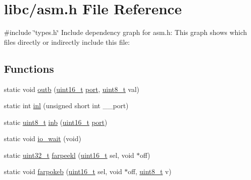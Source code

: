 \hypertarget{a00014}{}\section{libc/asm.h File Reference}
\label{a00014}
{\ttfamily \#include \char`\"{}types.\+h\char`\"{}}\newline
Include dependency graph for asm.\+h\+:
This graph shows which files directly or indirectly include this file\+:
\subsection*{Functions}
\begin{DoxyCompactItemize}
\item 
static void \hyperlink{a00014_aa37f5841c54156a4b14fc0d6f626b44f_aa37f5841c54156a4b14fc0d6f626b44f}{outb} (\hyperlink{a00038_adf4d876453337156dde61095e1f20223_adf4d876453337156dde61095e1f20223}{uint16\+\_\+t} \hyperlink{a00035_a938bdc6ae46c346147b6d4f67ad1e704_a938bdc6ae46c346147b6d4f67ad1e704}{port}, \hyperlink{a00038_aba7bc1797add20fe3efdf37ced1182c5_aba7bc1797add20fe3efdf37ced1182c5}{uint8\+\_\+t} val)
\item 
static int \hyperlink{a00014_a4a68dda29ab57d4961c91746b06af63f_a4a68dda29ab57d4961c91746b06af63f}{inl} (unsigned short int \+\_\+\+\_\+port)
\item 
static \hyperlink{a00038_aba7bc1797add20fe3efdf37ced1182c5_aba7bc1797add20fe3efdf37ced1182c5}{uint8\+\_\+t} \hyperlink{a00014_a0223c8898dfec29069879dc51076e28a_a0223c8898dfec29069879dc51076e28a}{inb} (\hyperlink{a00038_adf4d876453337156dde61095e1f20223_adf4d876453337156dde61095e1f20223}{uint16\+\_\+t} \hyperlink{a00035_a938bdc6ae46c346147b6d4f67ad1e704_a938bdc6ae46c346147b6d4f67ad1e704}{port})
\item 
static void \hyperlink{a00014_a488d1b3600792ee3aac5be4b7e0be16b_a488d1b3600792ee3aac5be4b7e0be16b}{io\+\_\+wait} (void)
\item 
static \hyperlink{a00038_a435d1572bf3f880d55459d9805097f62_a435d1572bf3f880d55459d9805097f62}{uint32\+\_\+t} \hyperlink{a00014_aee0779a0581136320f91a72c4d6b5b90_aee0779a0581136320f91a72c4d6b5b90}{farpeekl} (\hyperlink{a00038_adf4d876453337156dde61095e1f20223_adf4d876453337156dde61095e1f20223}{uint16\+\_\+t} sel, void $\ast$off)
\item 
static void \hyperlink{a00014_a4e7b04b927c6dca2d20f54a5c14a01d6_a4e7b04b927c6dca2d20f54a5c14a01d6}{farpokeb} (\hyperlink{a00038_adf4d876453337156dde61095e1f20223_adf4d876453337156dde61095e1f20223}{uint16\+\_\+t} sel, void $\ast$off, \hyperlink{a00038_aba7bc1797add20fe3efdf37ced1182c5_aba7bc1797add20fe3efdf37ced1182c5}{uint8\+\_\+t} v)

\end{DoxyCompactItemize}
